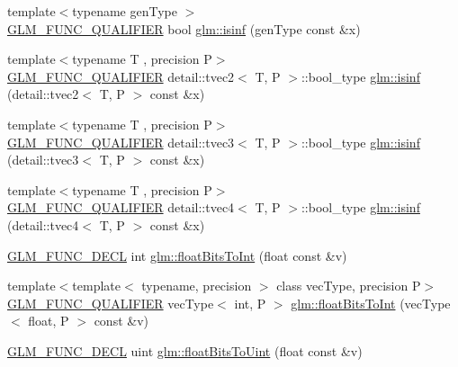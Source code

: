 \begin{DoxyCompactItemize}
\item 
{\footnotesize template$<$typename gen\+Type $>$ }\\\hyperlink{setup_8hpp_a33fdea6f91c5f834105f7415e2a64407}{G\+L\+M\+\_\+\+F\+U\+N\+C\+\_\+\+Q\+U\+A\+L\+I\+F\+I\+ER} bool \hyperlink{group__core__func__common_ga9fce6a337c7e8ad089b9dc17c70cb873}{glm\+::isinf} (gen\+Type const \&x)
\item 
{\footnotesize template$<$typename T , precision P$>$ }\\\hyperlink{setup_8hpp_a33fdea6f91c5f834105f7415e2a64407}{G\+L\+M\+\_\+\+F\+U\+N\+C\+\_\+\+Q\+U\+A\+L\+I\+F\+I\+ER} detail\+::tvec2$<$ T, P $>$\+::bool\+\_\+type \hyperlink{namespaceglm_ab39af0e09cb831f24caeddc6268544a8}{glm\+::isinf} (detail\+::tvec2$<$ T, P $>$ const \&x)
\item 
{\footnotesize template$<$typename T , precision P$>$ }\\\hyperlink{setup_8hpp_a33fdea6f91c5f834105f7415e2a64407}{G\+L\+M\+\_\+\+F\+U\+N\+C\+\_\+\+Q\+U\+A\+L\+I\+F\+I\+ER} detail\+::tvec3$<$ T, P $>$\+::bool\+\_\+type \hyperlink{namespaceglm_a8a5d58940820a56efe7f242f1730514e}{glm\+::isinf} (detail\+::tvec3$<$ T, P $>$ const \&x)
\item 
{\footnotesize template$<$typename T , precision P$>$ }\\\hyperlink{setup_8hpp_a33fdea6f91c5f834105f7415e2a64407}{G\+L\+M\+\_\+\+F\+U\+N\+C\+\_\+\+Q\+U\+A\+L\+I\+F\+I\+ER} detail\+::tvec4$<$ T, P $>$\+::bool\+\_\+type \hyperlink{namespaceglm_a6f75f001a105575c80f78d83e038b2d1}{glm\+::isinf} (detail\+::tvec4$<$ T, P $>$ const \&x)
\item 
\hyperlink{setup_8hpp_ab2d052de21a70539923e9bcbf6e83a51}{G\+L\+M\+\_\+\+F\+U\+N\+C\+\_\+\+D\+E\+CL} int \hyperlink{group__core__func__common_gadc6a536a7bef046c3293d2ccad6d9ca2}{glm\+::float\+Bits\+To\+Int} (float const \&v)
\item 
{\footnotesize template$<$template$<$ typename, precision $>$ class vec\+Type, precision P$>$ }\\\hyperlink{setup_8hpp_a33fdea6f91c5f834105f7415e2a64407}{G\+L\+M\+\_\+\+F\+U\+N\+C\+\_\+\+Q\+U\+A\+L\+I\+F\+I\+ER} vec\+Type$<$ int, P $>$ \hyperlink{group__core__func__common_gac4a0710238ae54c67931dd29a0b0f873}{glm\+::float\+Bits\+To\+Int} (vec\+Type$<$ float, P $>$ const \&v)
\item 
\hyperlink{setup_8hpp_ab2d052de21a70539923e9bcbf6e83a51}{G\+L\+M\+\_\+\+F\+U\+N\+C\+\_\+\+D\+E\+CL} uint \hyperlink{group__core__func__common_ga748b4d2819b48d28ca09dc8733488873}{glm\+::float\+Bits\+To\+Uint} (float const \&v)

\end{DoxyCompactItemize}
